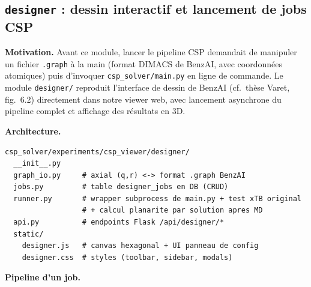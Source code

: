 \subsection{\texttt{designer} : dessin interactif et lancement de jobs CSP}
\label{sec:designer}


\textbf{Motivation.} Avant ce module, lancer le pipeline CSP demandait
de manipuler un fichier \texttt{.graph} à la main (format DIMACS de BenzAI,
avec coordonnées atomiques) puis d'invoquer \texttt{csp\_solver/main.py}
en ligne de commande. Le module \texttt{designer/} reproduit l'interface
de dessin de BenzAI (cf.~thèse Varet, fig.~6.2) directement dans notre
viewer web, avec lancement asynchrone du pipeline complet et affichage
des résultats en 3D.

\textbf{Architecture.}

\begin{lstlisting}[style=benzai]
csp_solver/experiments/csp_viewer/designer/
  __init__.py
  graph_io.py     # axial (q,r) <-> format .graph BenzAI
  jobs.py         # table designer_jobs en DB (CRUD)
  runner.py       # wrapper subprocess de main.py + test xTB original
                  # + calcul planarite par solution apres MD
  api.py          # endpoints Flask /api/designer/*
  static/
    designer.js   # canvas hexagonal + UI panneau de config
    designer.css  # styles (toolbar, sidebar, modals)
\end{lstlisting}

\textbf{Pipeline d'un job.}


